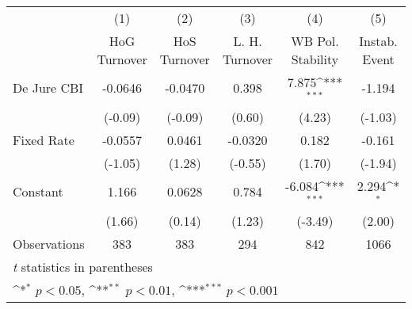 \begin{table}[htbp]\centering
\def\sym#1{\ifmmode^{#1}\else\(^{#1}\)\fi}
\caption{\label{lowKIfivs}}
\begin{tabular}{l*{5}{c}}
\toprule
                                        &\multicolumn{1}{c}{(1)}&\multicolumn{1}{c}{(2)}&\multicolumn{1}{c}{(3)}&\multicolumn{1}{c}{(4)}&\multicolumn{1}{c}{(5)}\\
                                        &\multicolumn{1}{c}{HoG Turnover}&\multicolumn{1}{c}{HoS Turnover}&\multicolumn{1}{c}{L. H. Turnover}&\multicolumn{1}{c}{WB Pol. Stability}&\multicolumn{1}{c}{Instab. Event}\\
\midrule
De Jure CBI                             &  -0.0646         &  -0.0470         &    0.398         &    7.875\sym{***}&   -1.194         \\
                                        &  (-0.09)         &  (-0.09)         &   (0.60)         &   (4.23)         &  (-1.03)         \\
\addlinespace
Fixed Rate                              &  -0.0557         &   0.0461         &  -0.0320         &    0.182         &   -0.161         \\
                                        &  (-1.05)         &   (1.28)         &  (-0.55)         &   (1.70)         &  (-1.94)         \\
\addlinespace
Constant                                &    1.166         &   0.0628         &    0.784         &   -6.084\sym{***}&    2.294\sym{*}  \\
                                        &   (1.66)         &   (0.14)         &   (1.23)         &  (-3.49)         &   (2.00)         \\
\midrule
Observations                            &      383         &      383         &      294         &      842         &     1066         \\
\bottomrule
\multicolumn{6}{l}{\footnotesize \textit{t} statistics in parentheses}\\
\multicolumn{6}{l}{\footnotesize \sym{*} \(p<0.05\), \sym{**} \(p<0.01\), \sym{***} \(p<0.001\)}\\
\end{tabular}
\end{table}
